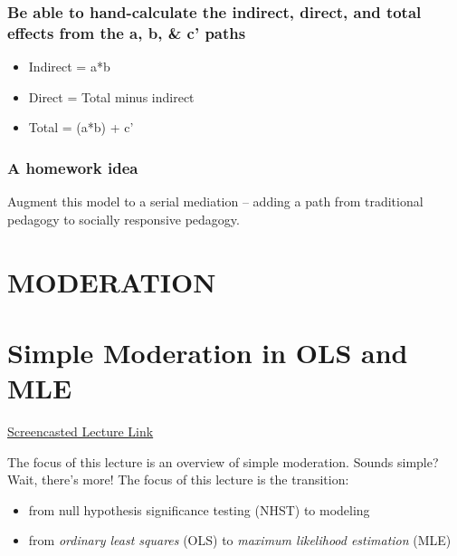 \documentclass[
  11pt,
]{book}
\providecommand{\tightlist}{%
  \setlength{\itemsep}{0pt}\setlength{\parskip}{0pt}}
\begin{document}
\hypertarget{be-able-to-hand-calculate-the-indirect-direct-and-total-effects-from-the-a-b-c-paths-1}{%
\subsection*{Be able to hand-calculate the indirect, direct, and total effects from the a, b, \& c' paths}\label{be-able-to-hand-calculate-the-indirect-direct-and-total-effects-from-the-a-b-c-paths-1}}


\begin{itemize}
\tightlist
\item
  Indirect = a*b
\item
  Direct = Total minus indirect
\item
  Total = (a*b) + c'
\end{itemize}

\hypertarget{a-homework-idea}{%
\subsection*{A homework idea}\label{a-homework-idea}}


Augment this model to a serial mediation -- adding a path from traditional pedagogy to socially responsive pedagogy.

\hypertarget{MOD}{%
\chapter*{MODERATION}\label{MOD}}


\hypertarget{SimpMod}{%
\chapter{Simple Moderation in OLS and MLE}\label{SimpMod}}

\href{https://spu.hosted.panopto.com/Panopto/Pages/Viewer.aspx?pid=cc098142-3693-4366-bb55-ad1d0175414e}{Screencasted Lecture Link}

The focus of this lecture is an overview of simple moderation. Sounds simple? Wait, there's more! The focus of this lecture is the transition:

\begin{itemize}
\tightlist
\item
  from null hypothesis significance testing (NHST) to modeling
\item
  from \emph{ordinary least squares} (OLS) to \emph{maximum likelihood estimation} (MLE)
\end{itemize}
\end{document}
